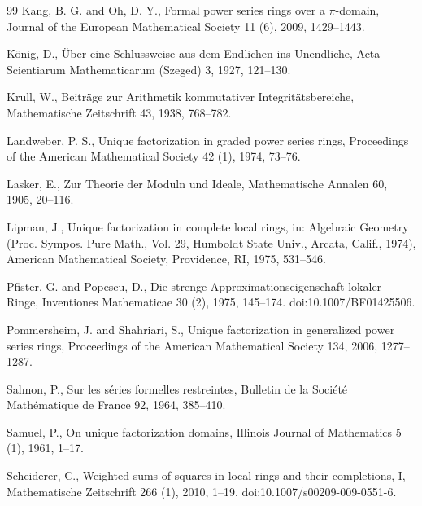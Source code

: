 \documentclass{article}
\newcommand{\Z}{\mathbb{Z}}
\theoremstyle{plain}
\theoremstyle{definition}
\theoremstyle{remark}
\theoremstyle{plain}
\begin{document}
\begin{thebibliography}{99}
 Kang, B. G. and Oh, D. Y., Formal power series rings over a $\pi$-domain, Journal of the European Mathematical Society 11 (6), 2009, 1429--1443.

 K{\"o}nig, D., \"Uber eine Schlussweise aus dem Endlichen ins Unendliche, Acta Scientiarum Mathematicarum (Szeged) 3, 1927, 121--130.

 Krull, W., Beitr\"age zur Arithmetik kommutativer Integrit\"atsbereiche, Mathematische Zeitschrift 43, 1938, 768--782.

 Landweber, P. S., Unique factorization in graded power series rings, Proceedings of the American Mathematical Society 42 (1), 1974, 73--76.

 Lasker, E., Zur Theorie der Moduln und Ideale, Mathematische Annalen 60, 1905, 20--116.

 Lipman, J., Unique factorization in complete local rings, in: Algebraic Geometry (Proc. Sympos. Pure Math., Vol. 29, Humboldt State Univ., Arcata, Calif., 1974), American Mathematical Society, Providence, RI, 1975, 531--546.


 Pfister, G. and Popescu, D., Die strenge Approximationseigenschaft lokaler Ringe, Inventiones Mathematicae 30 (2), 1975, 145--174. doi:10.1007/BF01425506.

 Pommersheim, J. and Shahriari, S., Unique factorization in generalized power series rings, Proceedings of the American Mathematical Society 134, 2006, 1277--1287.

 Salmon, P., Sur les s\'eries formelles restreintes, Bulletin de la Soci\'et\'e Math\'ematique de France 92, 1964, 385--410.

 Samuel, P., On unique factorization domains, Illinois Journal of Mathematics 5 (1), 1961, 1--17.

 Scheiderer, C., Weighted sums of squares in local rings and their completions, I, Mathematische Zeitschrift 266 (1), 2010, 1--19. doi:10.1007/s00209-009-0551-6.

\end{thebibliography}
\end{document}
